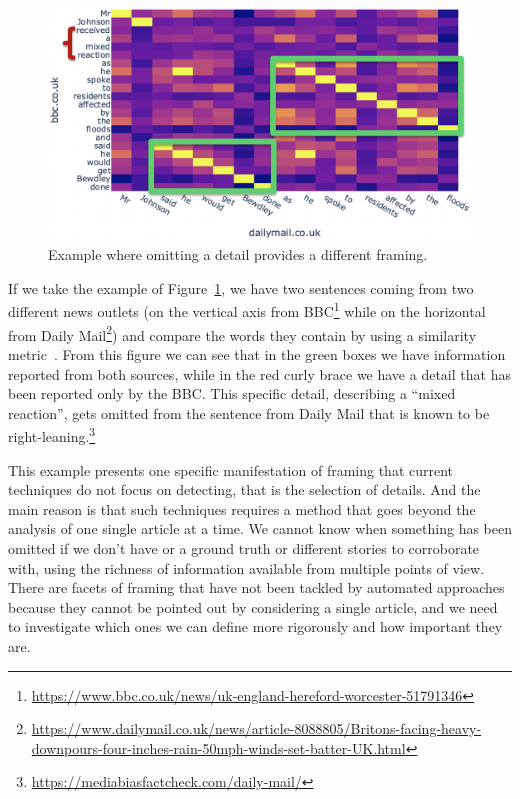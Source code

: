\begin{figure}[!htb]
    \centering
    \includegraphics[width=\linewidth]{figures/johnson_flood.png}
    \caption{Example where omitting a detail provides a different framing.}
    \label{fig:johnson_flood}
\end{figure}

If we take the example of Figure~\ref{fig:johnson_flood}, we have two sentences coming from two different news outlets (on the vertical axis from BBC\footnote{\url{https://www.bbc.co.uk/news/uk-england-hereford-worcester-51791346}} while on the horizontal from Daily Mail\footnote{\url{https://www.dailymail.co.uk/news/article-8088805/Britons-facing-heavy-downpours-four-inches-rain-50mph-winds-set-batter-UK.html}}) and compare the words they contain by using a similarity metric~\cite{cer2018universal}.
From this figure we can see that in the green boxes we have information reported from both sources, while in the red curly brace we have a detail that has been reported only by the BBC.
This specific detail, describing a ``mixed reaction'', gets omitted from the sentence from Daily Mail that is known to be right-leaning.\footnote{\url{https://mediabiasfactcheck.com/daily-mail/}}

This example presents one specific manifestation of framing that current techniques do not focus on detecting, that is the selection of details.
And the main reason is that such techniques requires a method that goes beyond the analysis of one single article at a time.
We cannot know when something has been omitted if we don't have or a ground truth or different stories to corroborate with, using the richness of information available from multiple points of view.
There are facets of framing that have not been tackled by automated approaches because they cannot be pointed out by considering a single article, and we need to investigate which ones we can define more rigorously and how important they are.


